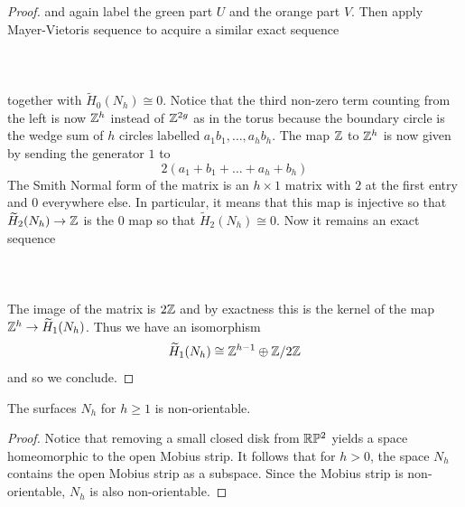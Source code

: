 \documentclass[a4paper]{article}
\begin{document}
\begin{prp}{}{}
\begin{proof}
and again label the green part $U$ and the orange part $V$. Then apply Mayer-Vietoris sequence to acquire a similar exact sequence \\~\\
\\~\\
together with $\widetilde{H}_0(N_h)\cong 0$. Notice that the third non-zero term counting from the left is now $\mathbb{Z}^h$ instead of $\mathbb{Z}^{2g}$ as in the torus because the boundary circle is the wedge sum of $h$ circles labelled $a_1b_1,\dots,a_hb_h$. The map $\mathbb{Z}$ to $\mathbb{Z}^h$ is now given by sending the generator $1$ to $$2(a_1+b_1+\dots+a_h+b_h)$$ The Smith Normal form of the matrix is an $h\times 1$ matrix with $2$ at the first entry and $0$ everywhere else. In particular, it means that this map is injective so that $\widetilde{H}_2(N_h)\to\mathbb{Z}$ is the $0$ map so that $\widetilde{H}_2(N_h)\cong 0$. Now it remains an exact sequence \\~\\
\\~\\
The image of the matrix is $2\mathbb{Z}$ and by exactness this is the kernel of the map $\mathbb{Z}^h\to\widetilde{H}_1(N_h)$. Thus we have an isomorphism $$\widetilde{H}_1(N_h)\cong\mathbb{Z}^{h-1}\oplus\mathbb{Z}/2\mathbb{Z}$$ and so we conclude. 
\end{proof}
\end{prp}

\begin{crl}{}{} The surfaces $N_h$ for $h\geq 1$ is non-orientable. \tcbline
\begin{proof}
Notice that removing a small closed disk from $\mathbb{R}\mathbb{P}^2$ yields a space homeomorphic to the open Mobius strip. It follows that for $h>0$, the space $N_h$ contains the open Mobius strip as a subspace. Since the Mobius strip is non-orientable, $N_h$ is also non-orientable. 
\end{proof}
\end{crl}
\end{document}
